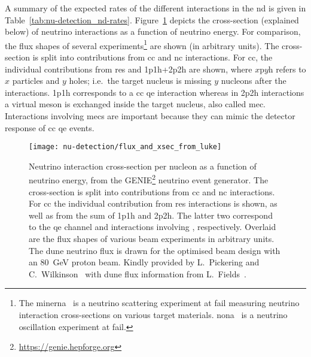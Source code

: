 A summary of the expected rates of the different interactions in the \dune{} \gls{nd} is given in Table~\ref{tab:nu-detection_nd-rates}.
Figure~\ref{fig:nu-detection_xsec_flux} depicts the cross-section (explained below) of neutrino interactions as a function of neutrino energy.
For comparison, the flux shapes of several experiments\footnote{The \acrfull{minerna}~\cite{minerna} is a neutrino scattering experiment at \acrshort{fail} measuring neutrino interaction cross-sections on various target materials. \acrfull{nona}~\cite{nona} is a neutrino oscillation experiment at \acrshort{fail}.} are shown (in arbitrary units).
The cross-section is split into contributions from \gls{cc} and \gls{nc} interactions.
For \gls{cc}, the individual contributions from \gls{res} and 1p1h+2p2h are shown, where $x$p$y$h refers to $x$ particles and $y$ holes; i.e.\ the target nucleus is missing $y$ nucleons after the interactions.
1p1h corresponds to a \gls{cc} \gls{qe} interaction whereas in 2p2h interactions a virtual meson is exchanged inside the target nucleus, also called \gls{mec}.
Interactions involving \glspl{mec} are important because they can mimic the detector response of \gls{cc} \gls{qe} events.

\begin{figure}[tbp]
	\begin{minipage}{\textwidth}
		\centering
		\texttt{[image: nu-detection/flux\_and\_xsec\_from\_luke]}
		\caption[Neutrino interaction cross-section and beam fluxes]{%
			Neutrino interaction cross-section per nucleon as a function of neutrino energy, from the GENIE\footnote{\url{https://genie.hepforge.org}} neutrino event generator.
			The cross-section is split into contributions from \acrshort{cc} and \acrshort{nc} interactions.
			For \acrshort{cc} the individual contribution from \acrshort{res} interactions is shown, as well as from the sum of 1p1h and 2p2h.
			The latter two correspond to the \acrshort{qe} channel and interactions involving , respectively.
			Overlaid are the flux shapes of various beam experiments in arbitrary units.
			The \acrshort{dune} neutrino flux is drawn for the optimised beam design with an \SI{80}{\giga\electronvolt} proton beam.
			Kindly provided by L.\ Pickering and C.\ Wilkinson~\cite{xsec_luke} with \acrshort{dune} flux information from L.\ Fields~\cite{lauraNDRates}.
		}
		\label{fig:nu-detection_xsec_flux}
	\end{minipage}
\end{figure}


